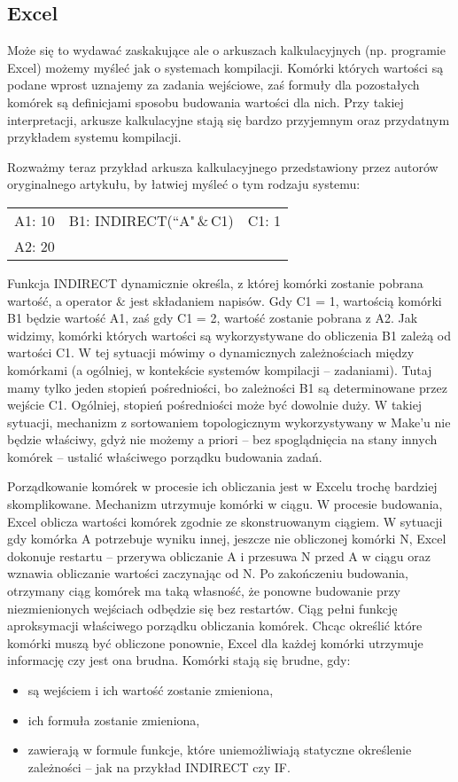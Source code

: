\subsection{Excel}

Może się to wydawać zaskakujące ale o arkuszach kalkulacyjnych (np. programie Excel) możemy myśleć jak o systemach kompilacji. Komórki których wartości są podane wprost uznajemy za zadania wejściowe, zaś formuły dla pozostałych komórek są definicjami sposobu budowania wartości dla nich. Przy takiej interpretacji, arkusze kalkulacyjne stają się bardzo przyjemnym oraz przydatnym przykładem systemu kompilacji.

Rozważmy teraz przykład arkusza kalkulacyjnego przedstawiony przez autorów oryginalnego artykułu, by łatwiej myśleć o tym rodzaju systemu:

\begin{tabular}{ l c r }
  A1: 10 & B1: INDIRECT(``A"\,\&\,C1) & C1: 1 \\
  A2: 20 & &
\end{tabular}

Funkcja INDIRECT dynamicznie określa, z której komórki zostanie pobrana wartość, a operator \(\&\) jest składaniem napisów. Gdy C1 = 1, wartością komórki B1 będzie wartość A1, zaś gdy C1 = 2, wartość zostanie pobrana z A2. Jak widzimy, komórki których wartości są wykorzystywane do obliczenia B1 zależą od wartości C1. W tej sytuacji mówimy o dynamicznych zależnościach między komórkami (a ogólniej, w kontekście systemów kompilacji -- zadaniami). Tutaj mamy tylko jeden stopień pośredniości, bo zależności B1 są determinowane przez wejście C1. Ogólniej, stopień pośredniości może być dowolnie duży. W takiej sytuacji, mechanizm z sortowaniem topologicznym wykorzystywany w Make'u nie będzie właściwy, gdyż nie możemy a priori -- bez spoglądnięcia na stany innych komórek -- ustalić właściwego porządku budowania zadań.

Porządkowanie komórek w procesie ich obliczania jest w Excelu trochę bardziej skomplikowane. Mechanizm utrzymuje komórki w ciągu. W procesie budowania, Excel oblicza wartości komórek zgodnie ze skonstruowanym ciągiem. W sytuacji gdy komórka A potrzebuje wyniku innej, jeszcze nie obliczonej komórki N, Excel dokonuje restartu -- przerywa obliczanie A i przesuwa N przed A w ciągu oraz wznawia obliczanie wartości zaczynając od N. Po zakończeniu budowania, otrzymany ciąg komórek ma taką własność, że ponowne budowanie przy niezmienionych wejściach odbędzie się bez restartów. Ciąg pełni funkcję aproksymacji właściwego porządku obliczania komórek. Chcąc określić które komórki muszą być obliczone ponownie, Excel dla każdej komórki utrzymuje informację czy jest ona brudna. Komórki stają się brudne, gdy:
\begin{itemize}
\item są wejściem i ich wartość zostanie zmieniona,
\item ich formuła zostanie zmieniona,
\item zawierają w formule funkcje, które uniemożliwiają statyczne określenie zależności -- jak na przykład INDIRECT czy IF.
\end{itemize}


